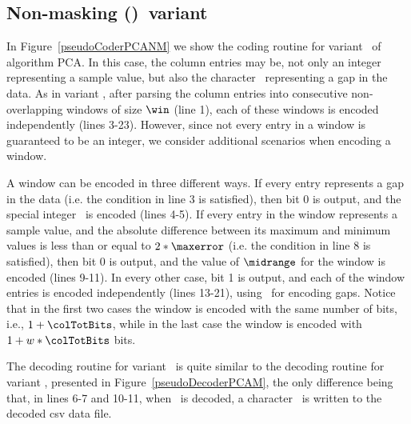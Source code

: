 \subsection{Non-masking (\NOmaskalgo)\ variant}
\label{algo:pca:nmvariant}


In Figure~\ref{pseudoCoderPCANM} we show the coding routine for variant \NOmaskalgo\ of algorithm PCA. In this case, the column entries may be, not only an integer representing a sample value, but also the character \noData\ representing a gap in the data. As in variant \maskalgo, after parsing the column entries into consecutive non-overlapping windows of size $\win$ (line 1), each of these windows is encoded independently (lines 3-23). However, since not every entry in a window is guaranteed to be an integer, we consider additional scenarios when encoding a window.





A window can be encoded in three different ways. If every entry represents a gap in the data (i.e. the condition in line 3 is satisfied), then bit 0 is output, and the special integer \nodata\ is encoded (lines 4-5). If every entry in the window represents a sample value, and the absolute difference between its maximum and minimum values is less than or equal to $2*\maxerror$ (i.e. the condition in line 8 is satisfied), then bit 0 is output, and the value of $\midrange$ for the window is encoded (lines 9-11). In every other case, bit 1 is output, and each of the window entries is encoded independently (lines 13-21), using \nodata\ for encoding gaps. Notice that in the first two cases the window is encoded with the same number of bits, i.e., $1 + \colTotBits$, while in the last case the window is encoded with $1 + w*\colTotBits$ bits.


The decoding routine for variant \NOmaskalgo\ is quite similar to the decoding routine for variant \maskalgo, presented in Figure~\ref{pseudoDecoderPCAM}, the only difference being that, in lines 6-7 and 10-11, when \nodata\ is decoded, a character \noData\ is written to the decoded csv data file.

